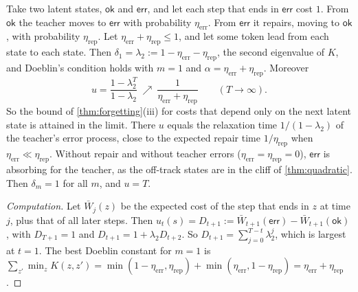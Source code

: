 \begin{example}\label{ex:selfcorrect}
\Pv\Ck Take two latent states, $\mathsf{ok}$ and $\mathsf{err}$, and let each step that ends in $\mathsf{err}$ cost $1$. From $\mathsf{ok}$ the
teacher moves to $\mathsf{err}$ with probability $\eta_{\mathrm{err}}$. From $\mathsf{err}$ it repairs, moving to $\mathsf{ok}$, with probability
$\eta_{\mathrm{rep}}$. Let $\eta_{\mathrm{err}}+\eta_{\mathrm{rep}}\le1$, and let some token lead from each state to each state. Then
$\delta_1=\lambda_2:=1-\eta_{\mathrm{err}}-\eta_{\mathrm{rep}}$, the second eigenvalue of $K$, and Doeblin's condition holds with $m=1$
and $\alpha=\eta_{\mathrm{err}}+\eta_{\mathrm{rep}}$. Moreover
\[
u=\frac{1-\lambda_2^T}{1-\lambda_2}\ \nearrow\ \frac1{\eta_{\mathrm{err}}+\eta_{\mathrm{rep}}}\qquad(T\to\infty).
\]
So the bound of \cref{thm:forgetting}(iii) for costs that depend only on the next latent state is attained in
the limit. There $u$ equals the relaxation time $1/(1-\lambda_2)$ of the teacher's error process, close to the
expected repair time $1/\eta_{\mathrm{rep}}$ when $\eta_{\mathrm{err}}\ll\eta_{\mathrm{rep}}$. Without repair and without teacher errors
($\eta_{\mathrm{err}}=\eta_{\mathrm{rep}}=0$), $\mathsf{err}$ is absorbing for the teacher, as the off-track states are in the cliff of
\cref{thm:quadratic}. Then $\delta_m=1$ for all $m$, and $u=T$.
\end{example}
\begin{proof}[Computation]
Let $\bar W_j(z)$ be the expected cost of the step that ends in $z$ at time $j$, plus that of all later steps. Then
$u_t(s)=D_{t+1}:=\bar W_{t+1}(\mathsf{err})-\bar W_{t+1}(\mathsf{ok})$, with $D_{T+1}=1$ and $D_{t+1}=1+\lambda_2D_{t+2}$. So
$D_{t+1}=\sum_{j=0}^{T-t}\lambda_2^j$, which is largest at $t=1$. The best Doeblin constant for $m=1$ is
$\sum_{z'}\min_zK(z,z')=\min(1-\eta_{\mathrm{err}},\eta_{\mathrm{rep}})+\min(\eta_{\mathrm{err}},1-\eta_{\mathrm{rep}})=\eta_{\mathrm{err}}+\eta_{\mathrm{rep}}$.
\end{proof}


